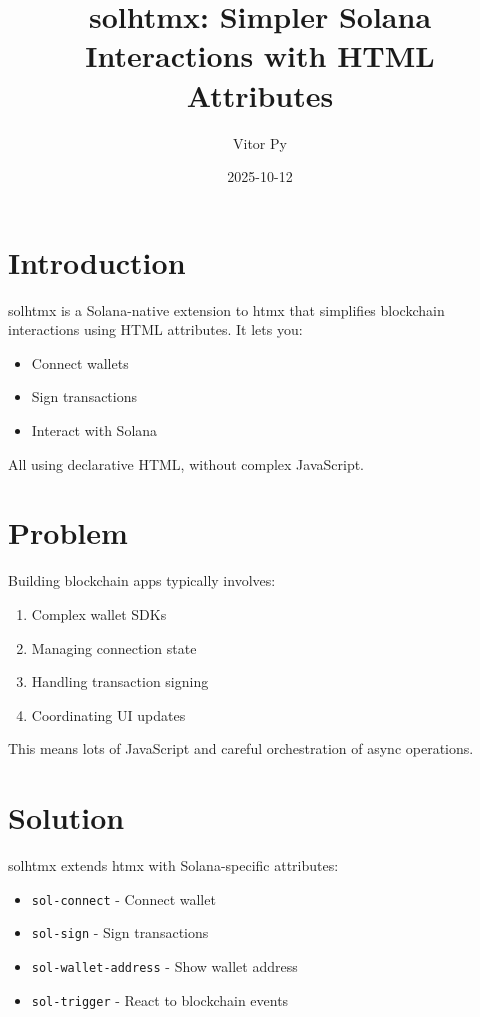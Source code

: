\documentclass{article}
\title{solhtmx: Simpler Solana Interactions with HTML Attributes}
\author{Vitor Py}
\date{2025-10-12}
\begin{document}

\maketitle

\section{Introduction}

solhtmx is a Solana-native extension to htmx that simplifies blockchain interactions using HTML attributes. It lets you:

\begin{itemize}
\item Connect wallets

\item Sign transactions

\item Interact with Solana

\end{itemize}

All using declarative HTML, without complex JavaScript.

\section{Problem}

Building blockchain apps typically involves:

\begin{enumerate}
\item Complex wallet SDKs

\item Managing connection state

\item Handling transaction signing

\item Coordinating UI updates

\end{enumerate}

This means lots of JavaScript and careful orchestration of async operations.

\section{Solution}

solhtmx extends htmx with Solana-specific attributes:

\begin{itemize}
\item \texttt{sol-connect} - Connect wallet

\item \texttt{sol-sign} - Sign transactions

\item \texttt{sol-wallet-address} - Show wallet address

\item \texttt{sol-trigger} - React to blockchain events

\end{itemize}
\end{document}
